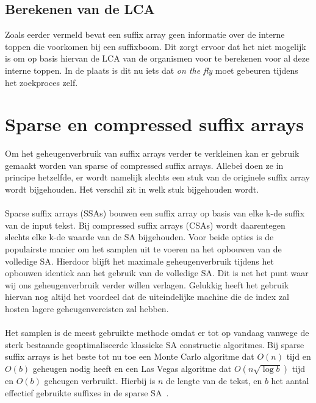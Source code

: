 \subsection{Berekenen van de LCA}\label{subsec:berekenen-van-de-lca}
Zoals eerder vermeld bevat een suffix array geen informatie over de interne toppen die voorkomen bij een suffixboom.
Dit zorgt ervoor dat het niet mogelijk is om op basis hiervan de LCA van de organismen voor te berekenen voor al deze interne toppen.
In de plaats is dit nu iets dat \textit{on the fly} moet gebeuren tijdens het zoekproces zelf.


\section{Sparse en compressed suffix arrays}\label{sec:sparse-en-compressed-suffix-arrays}
Om het geheugenverbruik van suffix arrays verder te verkleinen kan er gebruik gemaakt worden van sparse of compressed suffix arrays.
Allebei doen ze in principe hetzelfde, er wordt namelijk slechts een stuk van de originele suffix array wordt bijgehouden.
Het verschil zit in welk stuk bijgehouden wordt.
\\ \\
Sparse suffix arrays (SSAs) bouwen een suffix array op basis van elke k-de suffix van de input tekst.
Bij compressed suffix arrays (CSAs) wordt daarentegen slechts elke k-de waarde van de SA bijgehouden.
Voor beide opties is de populairste manier om het samplen uit te voeren na het opbouwen van de volledige SA.
Hierdoor blijft het maximale geheugenverbruik tijdens het opbouwen identiek aan het gebruik van de volledige SA\@.
Dit is net het punt waar wij ons geheugenverbruik verder willen verlagen.
Gelukkig heeft het gebruik hiervan nog altijd het voordeel dat de uiteindelijke machine die de index zal hosten lagere geheugenvereisten zal hebben.
\\ \\
Het samplen is de meest gebruikte methode omdat er tot op vandaag vanwege de sterk bestaande geoptimaliseerde klassieke SA constructie algoritmes.
Bij sparse suffix arrays is het beste tot nu toe een Monte Carlo algoritme dat $O(n)$ tijd en $O(b)$ geheugen nodig heeft en een Las Vegas algoritme dat $O(n \sqrt{\log b})$ tijd en $O(b)$ geheugen verbruikt.
Hierbij is $n$ de lengte van de tekst, en $b$ het aantal effectief gebruikte suffixes in de sparse SA~\cite{building_sparse_sa}.
